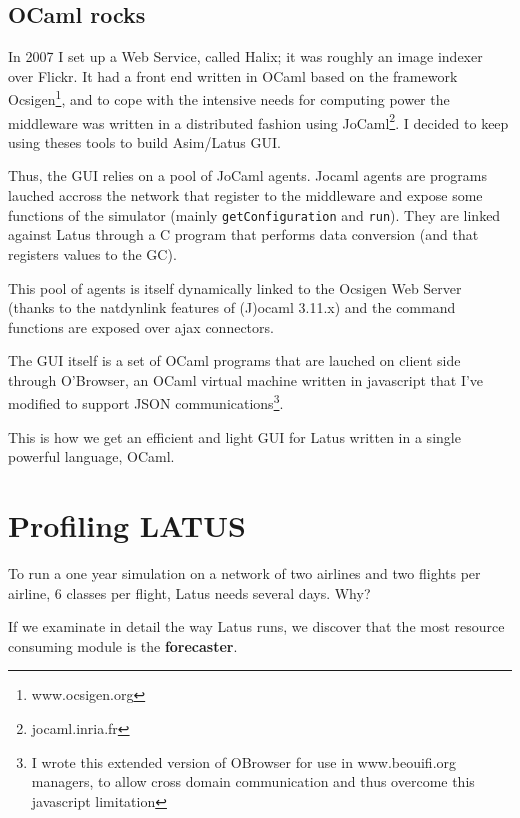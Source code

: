 \documentclass[11pt]{JHEP3}
\begin{document}
\subsection{OCaml rocks}

In 2007 I set up a Web Service, called Halix; it was roughly an image
indexer over Flickr. It had a front end written in OCaml based on the
framework Ocsigen\footnote{www.ocsigen.org}, and to cope with the
intensive needs for computing power the middleware was written in a
distributed fashion using JoCaml\footnote{jocaml.inria.fr}. I decided
to keep using theses tools to build Asim/Latus GUI.

\par Thus, the GUI relies on a pool of JoCaml agents. Jocaml agents
are programs lauched accross the network that register to the
middleware and expose some functions of the simulator (mainly
\texttt{getConfiguration} and \texttt{run}). They are linked against
Latus through a C program that performs data conversion (and that
registers values to the GC).

\par This pool of agents is itself dynamically linked to the Ocsigen
Web Server (thanks to the natdynlink features of (J)ocaml 3.11.x) and
the command functions are exposed over ajax connectors.

\par The GUI itself is a set of OCaml programs that are lauched on
client side through O'Browser, an OCaml virtual machine written in
javascript that I've modified to support JSON
communications\footnote{I wrote this extended version of OBrowser for
  use in www.beouifi.org managers, to allow cross domain communication
  and thus overcome this javascript limitation}.

This is how we get an efficient and light GUI for Latus written in a
single powerful language, OCaml.

\newpage

\section{Profiling LATUS}

To run a one year simulation on a network of two airlines and two
flights per airline, 6 classes per flight, Latus needs several
days. Why?

If we examinate in detail the way Latus runs, we discover that the
most resource consuming module is the \textbf{forecaster}.
\end{document}
